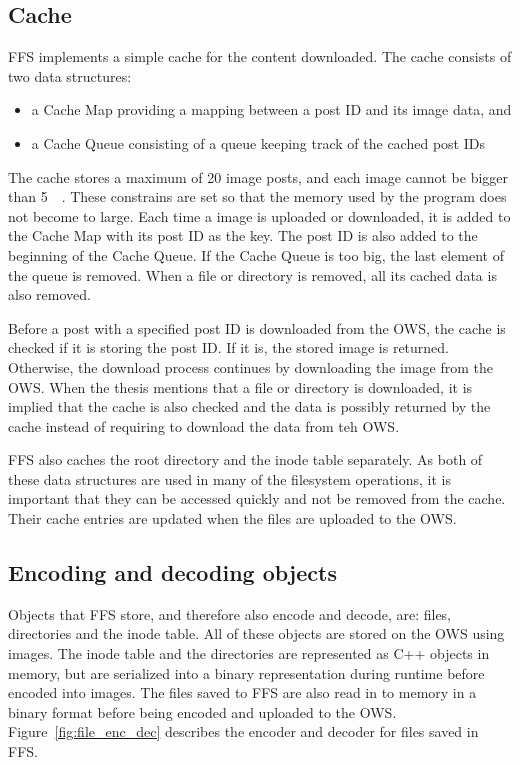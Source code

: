 \subsection{Cache}
FFS implements a simple cache for the content downloaded. The cache consists of two data structures: 
\begin{itemize}
	\item a Cache Map providing a mapping between a post ID and its image data, and
	\item a Cache Queue consisting of a queue keeping track of the cached post IDs
\end{itemize}
The cache stores a maximum of 20 image posts, and each image cannot be bigger than \SI{5}{\mega\byte}. These constrains are set so that the memory used by the program does not become to large. Each time a image is uploaded or downloaded, it is added to the Cache Map with its post ID as the key. The post ID is also added to the beginning of the Cache Queue. If the Cache Queue is too big, the last element of the queue is removed. When a file or directory is removed, all its cached data is also removed.

Before a post with a specified post ID is downloaded from the OWS, the cache is checked if it is storing the post ID. If it is, the stored image is returned. Otherwise, the download process continues by downloading the image from the OWS. When the thesis mentions that a file or directory is downloaded, it is implied that the cache is also checked and the data is possibly returned by the cache instead of requiring to download the data from teh OWS.

FFS also caches the root directory and the inode table separately. As both of these data structures are used in many of the filesystem operations, it is important that they can be accessed quickly and not be removed from the cache. Their cache entries are updated when the files are uploaded to the OWS.

\subsection{Encoding and decoding objects}
\label{subsec:file_enc_dec}
Objects that FFS store, and therefore also encode and decode, are: files, directories and the inode table. All of these objects are stored on the OWS using images. The inode table and the directories are represented as C++ objects in memory, but are serialized into a binary representation during runtime before encoded into images. The files saved to FFS are also read in to memory in a binary format before being encoded and uploaded to the OWS. Figure~\ref{fig:file_enc_dec} describes the encoder and decoder for files saved in FFS.

